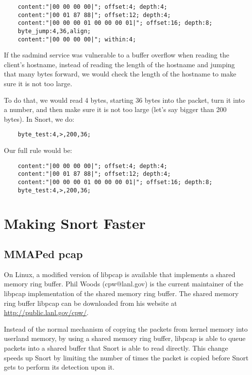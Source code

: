 \documentclass[english]{report}
\begin{document}
\begin{verbatim}
    content:"|00 00 00 00|"; offset:4; depth:4;
    content:"|00 01 87 88|"; offset:12; depth:4;
    content:"|00 00 00 01 00 00 00 01|"; offset:16; depth:8;
    byte_jump:4,36,align;
    content:"|00 00 00 00|"; within:4;
\end{verbatim}

If the sadmind service was vulnerable to a buffer overflow when reading the client's hostname, instead of reading the length of the hostname and jumping that many bytes forward, we would check the length of the hostname to make sure it is not too large.  

To do that, we would read 4 bytes, starting 36 bytes into the packet, turn it into a number, and then make sure it is not too large (let's say bigger than 200 bytes).  In Snort, we do: 

\begin{verbatim}
    byte_test:4,>,200,36;
\end{verbatim}
    
Our full rule would be:    

\begin{verbatim}
    content:"|00 00 00 00|"; offset:4; depth:4;
    content:"|00 01 87 88|"; offset:12; depth:4;
    content:"|00 00 00 01 00 00 00 01|"; offset:16; depth:8;
    byte_test:4,>,200,36;
\end{verbatim}

\newpage
\chapter{Making Snort Faster}

\section{MMAPed pcap}

On Linux, a modified version of libpcap is available that implements a shared memory ring buffer.  Phil Woods (cpw@lanl.gov) is the current maintainer of the libpcap implementation of the shared memory ring buffer.  The shared memory ring buffer libpcap can be downloaded from his website at \url{http://public.lanl.gov/cpw/}.

Instead of the normal mechanism of copying the packets from kernel memory into userland memory, by using a shared memory ring buffer, libpcap is able to queue packets into a shared buffer that Snort is able to read directly.  This change speeds up Snort by limiting the number of times the packet is copied before Snort gets to perform its detection upon it.
\end{document}
